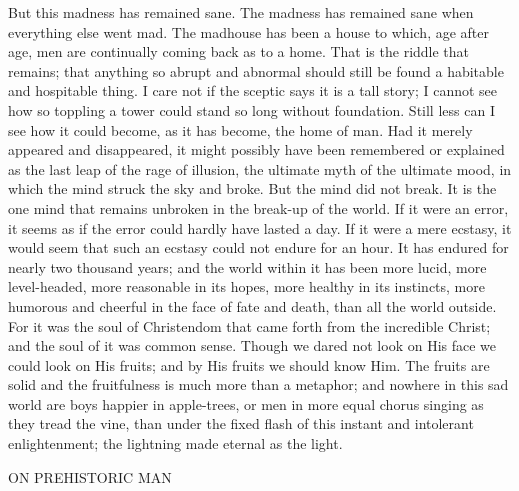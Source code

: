 But this madness has remained sane. The madness has remained sane when everything else went mad. The madhouse has been a house to which, age after age, men are continually coming back as to a home. That is the riddle that remains; that anything so abrupt and abnormal should still be found a habitable and hospitable thing. I care not if the sceptic says it is a tall story; I cannot see how so toppling a tower could stand so long without foundation. Still less can I see how it could become, as it has become, the home of man. Had it merely appeared and disappeared, it might possibly have been remembered or explained as the last leap of the rage of illusion, the ultimate myth of the ultimate mood, in which the mind struck the sky and broke. But the mind did not break. It is the one mind that remains unbroken in the break-up of the world. If it were an error, it seems as if the error could hardly have lasted a day. If it were a mere ecstasy, it would seem that such an ecstasy could not endure for an hour. It has endured for nearly two thousand years; and the world within it has been more lucid, more level-headed, more reasonable in its hopes, more healthy in its instincts, more humorous and cheerful in the face of fate and death, than all the world outside. For it was the soul of Christendom that came forth from the incredible Christ; and the soul of it was common sense. Though we dared not look on His face we could look on His fruits; and by His fruits we should know Him. The fruits are solid and the fruitfulness is much more than a metaphor; and nowhere in this sad world are boys happier in apple-trees, or men in more equal chorus singing as they tread the vine, than under the fixed flash of this instant and intolerant enlightenment; the lightning made eternal as the light.


ON PREHISTORIC MAN

